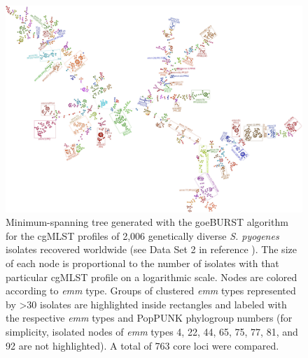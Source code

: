 \begin{landscape}
\vspace*{\fill}
\begin{figure}[h!]
    \centering
    \includegraphics[height=0.85\textheight]{figures/chapter 4/Figure2.pdf}
    \caption[Minimum-spanning tree generated with the goeBURST algorithm for the \ac{cgMLST} proﬁles of 2,006 genetically diverse \textit{S. pyogenes} isolates recovered worldwide.]{Minimum-spanning tree generated with the goeBURST algorithm for the \ac{cgMLST} proﬁles of 2,006 genetically diverse \textit{S. pyogenes} isolates recovered worldwide \cite{davies_atlas_2019} (see Data Set 2 in reference \cite{friaes_supplemental_2023}). The size of each node is proportional to the number of isolates with that particular \ac{cgMLST} proﬁle on a logarithmic scale. Nodes are colored according to \textit{emm} type. Groups of clustered \textit{emm} types represented by >30 isolates are highlighted inside rectangles and labeled with the respective \textit{emm} types and PopPUNK phylogroup numbers (for simplicity, isolated nodes of \textit{emm} types 4, 22, 44, 65, 75, 77, 81, and 92 are not highlighted). A total of 763 core loci were compared.}
    \label{fig:chap4_figure2}
\end{figure}
\vspace*{\fill}
\end{landscape}

